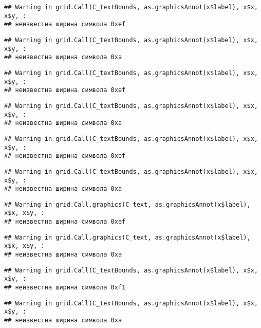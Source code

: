 \documentclass[
]{article}
\begin{document}
\begin{verbatim}
## Warning in grid.Call(C_textBounds, as.graphicsAnnot(x$label), x$x, x$y, :
## неизвестна ширина символа 0xef
\end{verbatim}

\begin{verbatim}
## Warning in grid.Call(C_textBounds, as.graphicsAnnot(x$label), x$x, x$y, :
## неизвестна ширина символа 0xa
\end{verbatim}

\begin{verbatim}
## Warning in grid.Call(C_textBounds, as.graphicsAnnot(x$label), x$x, x$y, :
## неизвестна ширина символа 0xef
\end{verbatim}

\begin{verbatim}
## Warning in grid.Call(C_textBounds, as.graphicsAnnot(x$label), x$x, x$y, :
## неизвестна ширина символа 0xa
\end{verbatim}

\begin{verbatim}
## Warning in grid.Call(C_textBounds, as.graphicsAnnot(x$label), x$x, x$y, :
## неизвестна ширина символа 0xef
\end{verbatim}

\begin{verbatim}
## Warning in grid.Call(C_textBounds, as.graphicsAnnot(x$label), x$x, x$y, :
## неизвестна ширина символа 0xa
\end{verbatim}

\begin{verbatim}
## Warning in grid.Call.graphics(C_text, as.graphicsAnnot(x$label), x$x, x$y, :
## неизвестна ширина символа 0xef
\end{verbatim}

\begin{verbatim}
## Warning in grid.Call.graphics(C_text, as.graphicsAnnot(x$label), x$x, x$y, :
## неизвестна ширина символа 0xa
\end{verbatim}

\begin{verbatim}
## Warning in grid.Call(C_textBounds, as.graphicsAnnot(x$label), x$x, x$y, :
## неизвестна ширина символа 0xf1
\end{verbatim}

\begin{verbatim}
## Warning in grid.Call(C_textBounds, as.graphicsAnnot(x$label), x$x, x$y, :
## неизвестна ширина символа 0xa
\end{verbatim}
\end{document}

